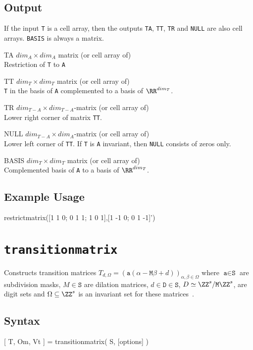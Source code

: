 \subsection*{Output}
If the input \texttt{T} is a cell array, then the outputs 
\texttt{TA}, 
\texttt{TT}, 
\texttt{TR} and 
\texttt{NULL}
are also cell arrays. \texttt{BASIS} is always a matrix.
\begin{param}
\item[TA] $dim_A\times dim_A$ matrix (or cell array of)\\ Restriction of \texttt{T} to \texttt{A}
\item[TT] $dim_T\times dim_T$ matrix (or cell array of)\\ \texttt{T} in the basis of \texttt{A} complemented to a basis of $\RR^{dim_T}$.
\item[TR] $dim_{T-A}\times dim_{T-A}$-matrix (or cell array of)\\ Lower right corner of matrix \texttt{TT}.
\item[NULL] $dim_{T-A}\times dim_{A}$-matrix (or cell array of)\\ Lower left corner of \texttt{TT}. If \texttt{T} is \texttt{A} invariant, then \texttt{NULL} consists of zeros only.
\item[BASIS] $dim_T\times dim_T$ matrix (or cell array of)\\Complemented basis of \texttt{A} to a basis of $\RR^{dim_T}$.
\end{param} 

\subsection*{Example Usage}
\begin{param}
\item[{restrictmatrix([1 1 0; 0 1 1; 1 0 1],[1 -1 0; 0 1 -1]')}]
\end{param}

\section{\texttt{transitionmatrix}}
Constructs transition matrices 
$T_{d, \Omega}=(\texttt{a}(\alpha-\texttt{M}\beta+d))_{\alpha, \beta\in\Omega}$ 
where 
$\texttt{a}\in\texttt{S}$ are subdivision masks, 
$M\in\texttt{S}$ are dilation matrices, 
$d\in\texttt{D}\in\texttt{S}$, $D\simeq\ZZ^s/\texttt{M}\ZZ^s$, are digit sets and $\Omega\subseteq\ZZ^s$ is an invariant set for these matrices~\cite{CM18}.
\subsection*{Syntax}
\begin{param}
\item[{[ T, Om, Vt ] = transitionmatrix( S, [options] )}]
\end{param}

